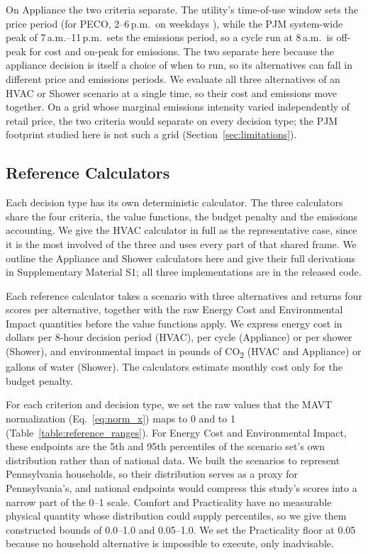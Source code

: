 \documentclass[final,3p,times]{elsarticle}
\begin{document}
On Appliance the two criteria separate. The utility's time-of-use window sets the price period (for PECO, 2--6\,p.m.\ on weekdays \cite{peco2021}), while the PJM system-wide peak of 7\,a.m.--11\,p.m.\ sets the emissions period, so a cycle run at 8\,a.m.\ is off-peak for cost and on-peak for emissions. The two separate here because the appliance decision is itself a choice of when to run, so its alternatives can fall in different price and emissions periods. We evaluate all three alternatives of an HVAC or Shower scenario at a single time, so their cost and emissions move together. On a grid whose marginal emissions intensity varied independently of retail price, the two criteria would separate on every decision type; the PJM footprint studied here is not such a grid (Section~\ref{sec:limitations}).

\FloatBarrier
\subsection{Reference Calculators}
\label{sec:gt-calculators}

Each decision type has its own deterministic calculator. The three calculators share the four criteria, the value functions, the budget penalty and the emissions accounting. We give the HVAC calculator in full as the representative case, since it is the most involved of the three and uses every part of that shared frame. We outline the Appliance and Shower calculators here and give their full derivations in Supplementary Material S1; all three implementations are in the released code.

Each reference calculator takes a scenario with three alternatives and returns four scores per alternative, together with the raw Energy Cost and Environmental Impact quantities before the value functions apply. We express energy cost in dollars per 8-hour decision period (HVAC), per cycle (Appliance) or per shower (Shower), and environmental impact in pounds of CO\textsubscript{2} (HVAC and Appliance) or gallons of water (Shower). The calculators estimate monthly cost only for the budget penalty.

For each criterion and decision type, we set the raw values that the MAVT normalization (Eq.~\ref{eq:norm_x}) maps to 0 and to 1 (Table~\ref{table:reference_ranges}). For Energy Cost and Environmental Impact, these endpoints are the 5th and 95th percentiles of the scenario set's own distribution rather than of national data. We built the scenarios to represent Pennsylvania households, so their distribution serves as a proxy for Pennsylvania's, and national endpoints would compress this study's scores into a narrow part of the 0--1 scale. Comfort and Practicality have no measurable physical quantity whose distribution could supply percentiles, so we give them constructed bounds of 0.0--1.0 and 0.05--1.0. We set the Practicality floor at 0.05 because no household alternative is impossible to execute, only inadvisable.
\end{document}
